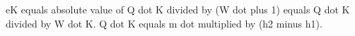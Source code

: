 eK equals absolute value of Q dot K divided by (W dot plus 1) equals Q dot K divided by W dot K.  
Q dot K equals m dot multiplied by (h2 minus h1).